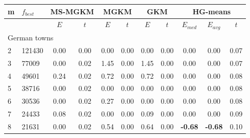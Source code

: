 {\footnotesize
\centering
\begin{longtable}{@{}llccccccccc@{}}
\hline
\multicolumn{1}{l|}{m}  & \multicolumn{1}{l|}{$f_{best}$} & \multicolumn{2}{c|}{MS-MGKM}     & \multicolumn{2}{c|}{MGKM}        & \multicolumn{2}{c|}{GKM}         & \multicolumn{3}{c}{HG-means}               \\ \hline
                        & \multicolumn{1}{l|}{}           & $E$  & \multicolumn{1}{c|}{$t$}  & $E$  & \multicolumn{1}{c|}{$t$}  & $E$  & \multicolumn{1}{c|}{$t$}  & $E_{med}$      & $E_{avg}$      & $t$  \\ \hline
\multicolumn{11}{l}{German towns}                                                                                                                                                                           \\ \hline
\multicolumn{1}{l|}{2}  & \multicolumn{1}{l|}{121430}     & 0.00 & \multicolumn{1}{c|}{0.00} & 0.00 & \multicolumn{1}{c|}{0.00} & 0.00 & \multicolumn{1}{c|}{0.00} & 0.00           & 0.00           & 0.07 \\
\multicolumn{1}{l|}{3}  & \multicolumn{1}{l|}{77009}      & 0.00 & \multicolumn{1}{c|}{0.02} & 1.45 & \multicolumn{1}{c|}{0.00} & 1.45 & \multicolumn{1}{c|}{0.00} & 0.00           & 0.00           & 0.07 \\
\multicolumn{1}{l|}{4}  & \multicolumn{1}{l|}{49601}      & 0.24 & \multicolumn{1}{c|}{0.02} & 0.72 & \multicolumn{1}{c|}{0.00} & 0.72 & \multicolumn{1}{c|}{0.00} & 0.00           & 0.00           & 0.08 \\
\multicolumn{1}{l|}{5}  & \multicolumn{1}{l|}{38716}      & 0.00 & \multicolumn{1}{c|}{0.02} & 0.00 & \multicolumn{1}{c|}{0.00} & 0.00 & \multicolumn{1}{c|}{0.00} & 0.00           & 0.00           & 0.08 \\
\multicolumn{1}{l|}{6}  & \multicolumn{1}{l|}{30536}      & 0.00 & \multicolumn{1}{c|}{0.02} & 0.27 & \multicolumn{1}{c|}{0.00} & 0.00 & \multicolumn{1}{c|}{0.00} & 0.00           & 0.00           & 0.08 \\
\multicolumn{1}{l|}{7}  & \multicolumn{1}{l|}{24433}      & 0.08 & \multicolumn{1}{c|}{0.02} & 0.00 & \multicolumn{1}{c|}{0.00} & 0.09 & \multicolumn{1}{c|}{0.00} & 0.00           & 0.00           & 0.09 \\
\multicolumn{1}{l|}{8}  & \multicolumn{1}{l|}{21631}      & 0.00 & \multicolumn{1}{c|}{0.02} & 0.54 & \multicolumn{1}{c|}{0.00} & 0.64 & \multicolumn{1}{c|}{0.00} & \textbf{-0.68} & \textbf{-0.68} & 0.10 \\

\end{longtable}}
